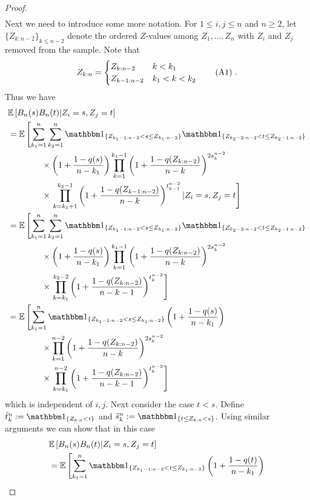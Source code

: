 \begin{lemma}
\begin{proof}
\begin{align*}
		\end{align*}
		Next we need to introduce some more notation. For $1\leq i,j\leq n$ and $n\geq 2$, let $\{Z_{k:n-2}\}_{k\leq n-2}$ denote the ordered $Z$-values among $Z_1,\dots, Z_n$ with $Z_i$ and $Z_j$ removed from the sample. Note that
		\[ Z_{k:n} = \begin{cases} 
		Z_{k:n-2} & k < k_1  \\
		Z_{k-1:n-2} & k_1 < k < k_2
		\end{cases}\numberthis\label{eq:zkn_zknminustwo}\mdot
		\]	
		Thus we have
		\begin{align*}
		&\E\left[B_n(s)B_n(t)|Z_i=s, Z_j=t\right]\\
		&= \E\left[\sum_{k_1=1}^{n} \sum_{k_2=1}^{n} \I{Z_{k_1-1:n-2} < s \leq Z_{k_1:n-2}} \I{Z_{k_2-2:n-2} < t \leq Z_{k_2-1:n-2}}\right.\\ 
		&\qquad\qquad \times \left(1+\frac{1-q(s)}{n-k_1}\right)\prod_{k=1}^{k_1-1}\left(1+\frac{1-q(Z_{k:n-2})}{n-k}\right)^{2s_k^{n-2}} \\
		&\qquad\qquad \times \left. \prod_{k=k_1+1}^{k_2-1}\left(1+\frac{1-q(Z_{k-1:n-2})}{n-k}\right)^{t_{k-1}^{n-2}} | Z_i=s, Z_j=t\right]\\
		&= \E\left[\sum_{k_1=1}^{n} \sum_{k_2=1}^{n} \I{Z_{k_1-1:n-2} < s \leq Z_{k_1:n-2}} \I{Z_{k_2-2:n-2} < t \leq Z_{k_2-1:n-2}}\right.\\ 
		&\qquad\qquad \times \left(1+\frac{1-q(s)}{n-k_1}\right)\prod_{k=1}^{k_1-1}\left(1+\frac{1-q(Z_{k:n-2})}{n-k}\right)^{2s_k^{n-2}} \\
		&\qquad\qquad \times \left. \prod_{k=k_1}^{k_2-2}\left(1+\frac{1-q(Z_{k:n-2})}{n-k-1}\right)^{t_{k}^{n-2}}\right]\\
		&= \E\left[\sum_{k_1=1}^{n} \I{Z_{k_1-1:n-2} < s \leq Z_{k_1:n-2}} \left(1+\frac{1-q(s)}{n-k_1}\right) \right.\\ 
		&\qquad\qquad \times \prod_{k=1}^{n-2}\left(1+\frac{1-q(Z_{k:n-2})}{n-k}\right)^{2s_k^{n-2}} \\
		&\qquad\qquad \times \left. \prod_{k=k_1}^{n-2}\left(1+\frac{1-q(Z_{k:n-2})}{n-k-1}\right)^{t_{k}^{n-2}}\right]
		\end{align*}		
		which is independent of $i,j$. Next consider the case $t<s$. Define $\tilde{t}_k^n := \I{Z_{k:n} < t}$ and $\tilde{s}_k^n := \I{t\leq Z_{k:n} < s}$. Using similar arguments we can show that in this case 
		\begin{align*}
		&\E\left[B_n(s)B_n(t)|Z_i=s, Z_j=t\right]\\
		&= \E\left[\sum_{k_1=1}^{n} \I{Z_{k_1-1:n-2} < t \leq Z_{k_1:n-2}} \left(1+\frac{1-q(t)}{n-k_1}\right) \right.\\ 

\end{align*}
\end{proof}
\end{lemma}
